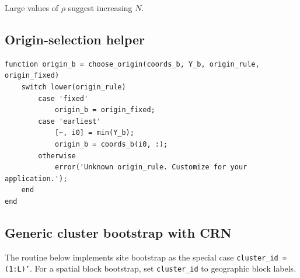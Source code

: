 \documentclass[11pt]{article}
\begin{document}
Large values of $\rho$ suggest increasing $N$.

\subsection{Origin-selection helper}

\begin{lstlisting}
function origin_b = choose_origin(coords_b, Y_b, origin_rule, origin_fixed)
    switch lower(origin_rule)
        case 'fixed'
            origin_b = origin_fixed;
        case 'earliest'
            [~, i0] = min(Y_b);
            origin_b = coords_b(i0, :);
        otherwise
            error('Unknown origin_rule. Customize for your application.');
    end
end
\end{lstlisting}

\subsection{Generic cluster bootstrap with CRN}

The routine below implements site bootstrap as the special case
\texttt{cluster\_id = (1:L)'}. For a spatial block bootstrap, set
\texttt{cluster\_id} to geographic block labels.
\end{document}
